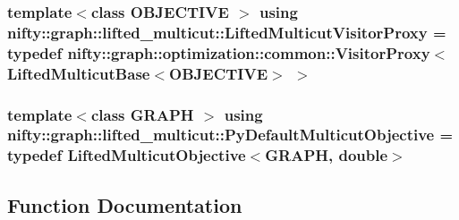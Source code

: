 \subsubsection[{Lifted\+Multicut\+Visitor\+Proxy}]{\setlength{\rightskip}{0pt plus 5cm}template$<$class O\+B\+J\+E\+C\+T\+I\+V\+E $>$ using {\bf nifty\+::graph\+::lifted\+\_\+multicut\+::\+Lifted\+Multicut\+Visitor\+Proxy} = typedef {\bf nifty\+::graph\+::optimization\+::common\+::\+Visitor\+Proxy}$<$ {\bf Lifted\+Multicut\+Base}$<$O\+B\+J\+E\+C\+T\+I\+V\+E$>$ $>$}\label{namespacenifty_1_1graph_1_1lifted__multicut_ae0f8360a0bdf9d1caa577c1889fda20c}
\hypertarget{namespacenifty_1_1graph_1_1lifted__multicut_aa2646f38679a289646a62e306949995d}{}
\subsubsection[{Py\+Default\+Multicut\+Objective}]{\setlength{\rightskip}{0pt plus 5cm}template$<$class G\+R\+A\+P\+H $>$ using {\bf nifty\+::graph\+::lifted\+\_\+multicut\+::\+Py\+Default\+Multicut\+Objective} = typedef {\bf Lifted\+Multicut\+Objective}$<$G\+R\+A\+P\+H, double$>$}\label{namespacenifty_1_1graph_1_1lifted__multicut_aa2646f38679a289646a62e306949995d}


\subsection{Function Documentation}
\hypertarget{namespacenifty_1_1graph_1_1lifted__multicut_a32c91d0c3068e4f685dd6e0265eef138}{}
